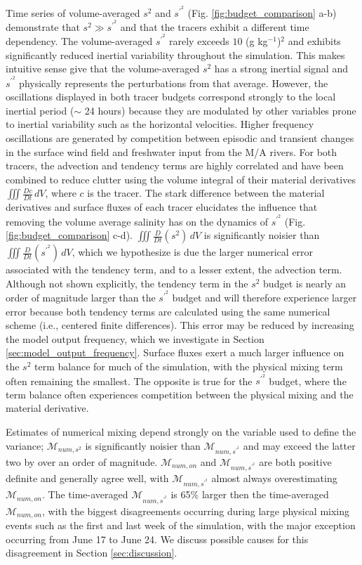 \documentclass[draft]{agujournal2019}
\begin{document}
Time series of volume-averaged $s^2$ and $s^{\prime^2}$ (Fig. \ref{fig:budget_comparison} a-b) demonstrate that $s^2\gg s^{\prime^2}$ and that the tracers exhibit a different time dependency. The volume-averaged $s^{\prime^2}$ rarely exceeds $10$ (g kg$^{-1}$)$^2$ and exhibits significantly reduced inertial variability throughout the simulation. This makes intuitive sense give that the volume-averaged $s^2$ has a strong inertial signal and $s^{\prime^2}$ physically represents the perturbations from that average. However, the oscillations displayed in both tracer budgets correspond strongly to the local inertial period ($\sim$ 24 hours) because they are modulated by other variables prone to inertial variability such as the horizontal velocities. Higher frequency oscillations are generated by competition between episodic and transient changes in the surface wind field and freshwater input from the M/A rivers. For both tracers, the advection and tendency terms are highly correlated and have been combined to reduce clutter using the volume integral of their material derivatives $\iiint \frac{Dc}{Dt} \, dV$, where $c$ is the tracer. The stark difference between the material derivatives and surface fluxes of each tracer elucidates the influence that removing the volume average salinity has on the dynamics of $s^{\prime^2}$ (Fig. \ref{fig:budget_comparison} c-d). $\iiint \frac{D}{Dt}(s^2) \, dV$ is significantly noisier than $\iiint \frac{D}{Dt}(s^{\prime^2}) \, dV$, which we hypothesize is due the larger numerical error associated with the tendency term, and to a lesser extent, the advection term. Although not shown explicitly, the tendency term in the $s^2$ budget is nearly an order of magnitude larger than the $s^{\prime^2}$ budget and will therefore experience larger error because both tendency terms are calculated using the same numerical scheme (i.e., centered finite differences). This error may be reduced by increasing the model output frequency, which we investigate in Section \ref{sec:model_output_frequency}. Surface fluxes exert a much larger influence on the $s^2$ term balance for much of the simulation, with the physical mixing term often remaining the smallest. The opposite is true for the $s^{\prime^2}$ budget, where the term balance often experiences competition between the physical mixing and the material derivative.  

Estimates of numerical mixing depend strongly on the variable used to define the variance; $\mathcal{M}_{num, s^2}$ is significantly noisier than $\mathcal{M}_{num, s^{\prime^2}}$ and may exceed the latter two by over an order of magnitude.  $\mathcal{M}_{num, on}$ and $\mathcal{M}_{num, s^{\prime^2}}$ are both positive definite and generally agree well, with $\mathcal{M}_{num, s^{\prime^2}}$ almost always overestimating $\mathcal{M}_{num, on}$. The time-averaged $\mathcal{M}_{num, s^{\prime^2}}$ is 65$\%$ larger then the time-averaged $\mathcal{M}_{num, on}$, with the biggest disagreements occurring during large physical mixing events such as the first and last week of the simulation, with the major exception occurring from June 17 to June 24. We discuss possible causes for this disagreement in Section \ref{sec:discussion}. 
\end{document}
